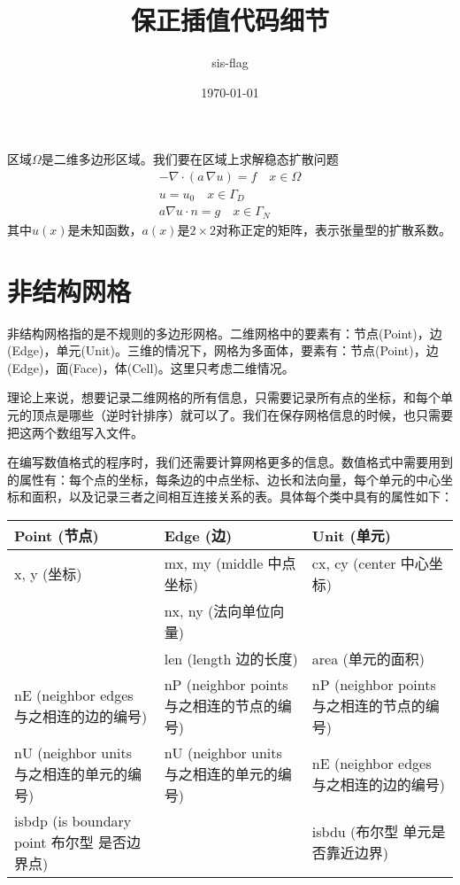 \documentclass[12pt,a4paper]{article}
\title{保正插值代码细节}
\author{sis-flag}
\date{\today}
\begin{document}
\maketitle

区域$\Omega$是二维多边形区域。我们要在区域上求解稳态扩散问题
\begin{align*}
- \nabla \cdot (a \, \nabla u) = f \quad x \in \Omega \\
u = u_0 \quad x \in \Gamma_D \\
a \nabla u \cdot n = g \quad x \in \Gamma_N
\end{align*}
其中$u(x)$是未知函数，$a(x)$是$2 \times 2$对称正定的矩阵，表示张量型的扩散系数。

\section*{非结构网格}

非结构网格指的是不规则的多边形网格。二维网格中的要素有：节点(Point)，边(Edge)，单元(Unit)。三维的情况下，网格为多面体，要素有：节点(Point)，边(Edge)，面(Face)，体(Cell)。这里只考虑二维情况。

理论上来说，想要记录二维网格的所有信息，只需要记录所有点的坐标，和每个单元的顶点是哪些（逆时针排序）就可以了。我们在保存网格信息的时候，也只需要把这两个数组写入文件。

在编写数值格式的程序时，我们还需要计算网格更多的信息。数值格式中需要用到的属性有：每个点的坐标，每条边的中点坐标、边长和法向量，每个单元的中心坐标和面积，以及记录三者之间相互连接关系的表。具体每个类中具有的属性如下：

\begin{tabular}{p{}p{}p{}}
\hline
 Point (节点) & Edge (边) & Unit (单元) \\
\hline
x, y (坐标) & mx, my (middle 中点坐标) & cx, cy (center 中心坐标) \\
 & nx, ny (法向单位向量) & \\
 & len (length 边的长度) & area (单元的面积) \\
nE (neighbor edges 与之相连的边的编号) & nP (neighbor points 与之相连的节点的编号) & nP (neighbor points 与之相连的节点的编号) \\
nU (neighbor units 与之相连的单元的编号) & nU (neighbor units 与之相连的单元的编号) & nE (neighbor edges 与之相连的边的编号) \\
isbdp (is boundary point 布尔型 是否边界点) & & isbdu (布尔型 单元是否靠近边界) \\
\hline
\end{tabular}
\end{document}
